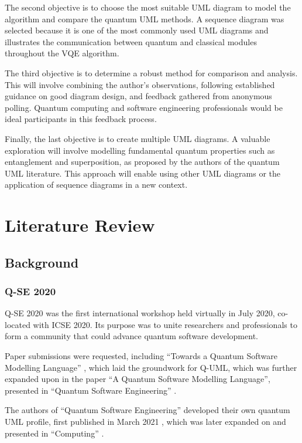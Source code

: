 \documentclass{article}
\begin{document}
The second objective is to choose the most suitable UML diagram to model the algorithm and compare the quantum UML methods. A sequence diagram was selected because it is one of the most commonly used UML diagrams and illustrates the communication between quantum and classical modules throughout the VQE algorithm.

The third objective is to determine a robust method for comparison and analysis. This will involve combining the author’s observations, following established guidance on good diagram design, and feedback gathered from anonymous polling. Quantum computing and software engineering professionals would be ideal participants in this feedback process.

Finally, the last objective is to create multiple UML diagrams. A valuable exploration will involve modelling fundamental quantum properties such as entanglement and superposition, as proposed by the authors of the quantum UML literature. This approach will enable using other UML diagrams or the application of sequence diagrams in a new context. 

\section{Literature Review}

\subsection{Background}

\subsubsection{Q-SE 2020}

Q-SE 2020 was the first international workshop held virtually in July 2020, co-located with ICSE 2020. Its purpose was to unite researchers and professionals to form a community that could advance quantum software development. 

Paper submissions were requested, including “Towards a Quantum Software Modelling Language” \cite{Perez-Delgado2020}, which laid the groundwork for Q-UML, which was further expanded upon in the paper “A Quantum Software Modelling Language”, presented in “Quantum Software Engineering” \cite{serrano2022quantum}.

The authors of “Quantum Software Engineering” \cite{serrano2022quantum} developed their own quantum UML profile, first published in March 2021 \cite{Pérez-Castillo2021}, which was later expanded on and presented in “Computing” \cite{Pérez-Castillo2022}.
\end{document}
